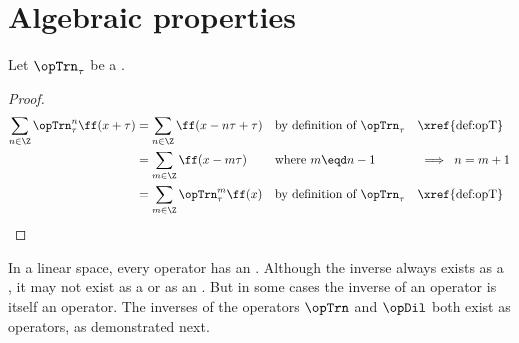 \section{Algebraic properties}
\begin{proposition}
\label{prop:opT_periodic}
Let $\opTrn_\tau$ be a  .
\end{proposition}
\begin{proof}
\begin{align*}
  \sum_{n\in\Z}\opTrn_\tau^n\ff(x+\tau)
    &= \sum_{n\in\Z}\ff(x-n\tau+\tau)
    && \text{by definition of $\opTrn_\tau$} && \text{\xref{def:opT}}
  \\&= \sum_{m\in\Z}\ff(x-m\tau)
    && \text{where $m\eqd n-1$}         && \implies\;n=m+1
  \\&= \sum_{m\in\Z}\opTrn_\tau^m\ff(x)
    && \text{by definition of $\opTrn_\tau$} && \text{\xref{def:opT}}
\end{align*}
\end{proof}

In a linear space, every operator has an .
Although the inverse always exists as a ,
it may not exist as a or as an .
But in some cases the inverse of an operator is itself an operator.
The inverses of the operators $\opTrn$ and $\opDil$ both exist as operators,
as demonstrated next.

